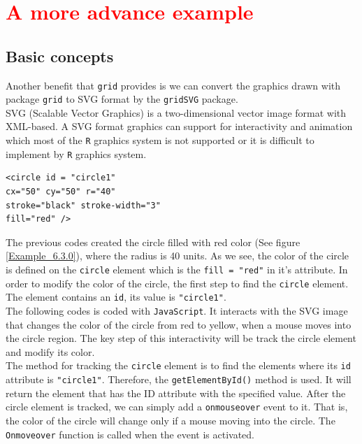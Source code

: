 \documentclass[paper=a4, fontsize=11pt]{report}
\begin{document}
\newpage
\section{\textcolor{red}{A more advance example}}
\subsection{Basic concepts}
Another benefit that \texttt{grid} provides is we can convert the graphics drawn with package \texttt{grid} to SVG format by the \texttt{gridSVG} package.\\

SVG (Scalable Vector Graphics) is a two-dimensional vector image format with XML-based. A SVG format graphics can support for interactivity and animation which most of the \texttt{R} graphics system is not supported or it is difficult to implement by \texttt{R} graphics system.\\

\begin{lstlisting}
<circle id = "circle1" 
cx="50" cy="50" r="40" 
stroke="black" stroke-width="3" 
fill="red" />
\end{lstlisting}

The previous codes created the circle filled with red color (See figure \ref{Example_6.3.0}), where the radius is 40 units. As we see, the color of the circle is defined on the \texttt{circle} element which is the \texttt{fill = "red"} in it's attribute. In order to modify the color of the circle, the first step to find the \texttt{circle} element. The element contains an \texttt{id}, its value is \texttt{"circle1"}.\\

The following codes is coded with \texttt{JavaScript}. It interacts with the SVG image that changes the color of the circle from red to yellow, when a mouse moves into the circle region. The key step of this interactivity will be track the circle element and modify its color.\\

The method for tracking the \texttt{circle} element is to find the elements where its \texttt{id} attribute is \texttt{"circle1"}. Therefore, the \texttt{getElementById()} method is used. It will return the element that has the ID attribute with the specified value. After the circle element is tracked, we can simply add a \texttt{onmouseover} event to it. That is, the color of the circle will change only if a mouse moving into the circle. The \texttt{Onmoveover} function is called when the event is activated.\\ 
\end{document}
